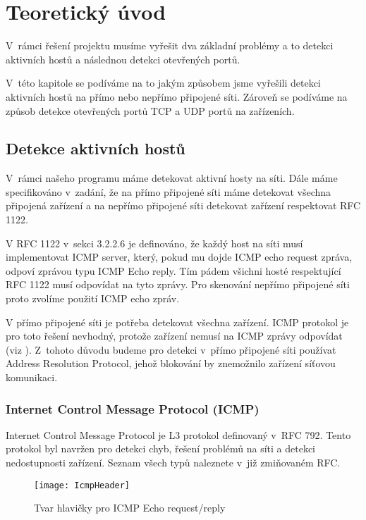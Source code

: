 \documentclass[../projekt.tex]{subfiles}
\begin{document}
\graphicspath{ {images/} }

\chapter{Teoretický úvod} \label{teoreticky-uvod}

V~rámci řešení projektu musíme vyřešit dva základní problémy a to detekci aktivních hostů a následnou detekci otevřených portů.

V~této kapitole se podíváme na to jakým způsobem jsme vyřešili detekci aktivních hostů na přímo nebo nepřímo připojené síti. Zároveň se podíváme na způsob detekce otevřených portů TCP a UDP portů na zařízeních. 

\section{Detekce aktivních hostů}
V~rámci našeho programu máme detekovat aktivní hosty na síti. Dále máme specifikováno v~zadání\cite{Zadani}, že na přímo připojené síti máme detekovat všechna připojená zařízení a na nepřímo připojené síti detekovat zařízení respektovat RFC 1122\cite{RFC1122}.

V RFC 1122\cite{RFC1122} v~sekci 3.2.2.6 je definováno, že každý host na síti musí implementovat ICMP server, který, pokud mu dojde ICMP echo request zpráva, odpoví zprávou typu ICMP Echo reply. Tím pádem všichni hosté respektující RFC 1122 musí odpovídat na tyto zprávy. Pro skenování nepřímo připojené síti proto zvolíme použití ICMP echo zpráv.

V přímo připojené síti je potřeba detekovat všechna zařízení. ICMP protokol je pro toto řešení nevhodný, protože zařízení nemusí na ICMP zprávy odpovídat (viz \cite{ICMP_Dsiable}). Z~tohoto důvodu budeme pro detekci v~přímo připojené síti používat Address Resolution Protocol, jehož blokování by znemožnilo zařízení síťovou komunikaci.

\subsection{Internet Control Message Protocol (ICMP)} \label{icmp}
Internet Control Message Protocol je L3 protokol definovaný v~RFC 792\cite{RFC0792}. Tento protokol byl navržen pro detekci chyb, řešení problémů na síti a detekci nedostupnosti zařízení. Seznam všech typů naleznete v~již zmiňovaném RFC\cite{RFC0792}.

\begin{figure}
    \texttt{[image: IcmpHeader]}
    \centering
    \caption{Tvar hlavičky pro ICMP Echo request/reply}
\end{figure}
\end{document}
